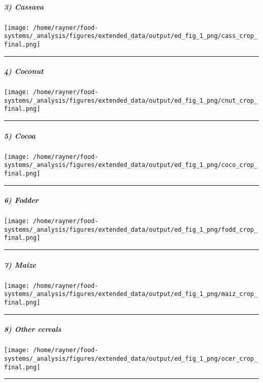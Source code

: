 \documentclass[
]{article}
\begin{document}
\hypertarget{cassava}{%
\subparagraph{3) Cassava}\label{cassava}}

\texttt{[image: /home/rayner/food-systems/\_analysis/figures/extended\_data/output/ed\_fig\_1\_png/cass\_crop\_final.png]}

\begin{center}\rule{0.5\linewidth}{0.5pt}\end{center}

\hypertarget{coconut}{%
\subparagraph{4) Coconut}\label{coconut}}

\texttt{[image: /home/rayner/food-systems/\_analysis/figures/extended\_data/output/ed\_fig\_1\_png/cnut\_crop\_final.png]}

\begin{center}\rule{0.5\linewidth}{0.5pt}\end{center}

\hypertarget{cocoa}{%
\subparagraph{5) Cocoa}\label{cocoa}}

\texttt{[image: /home/rayner/food-systems/\_analysis/figures/extended\_data/output/ed\_fig\_1\_png/coco\_crop\_final.png]}

\begin{center}\rule{0.5\linewidth}{0.5pt}\end{center}

\hypertarget{fodder}{%
\subparagraph{6) Fodder}\label{fodder}}

\texttt{[image: /home/rayner/food-systems/\_analysis/figures/extended\_data/output/ed\_fig\_1\_png/fodd\_crop\_final.png]}

\begin{center}\rule{0.5\linewidth}{0.5pt}\end{center}

\hypertarget{maize}{%
\subparagraph{7) Maize}\label{maize}}

\texttt{[image: /home/rayner/food-systems/\_analysis/figures/extended\_data/output/ed\_fig\_1\_png/maiz\_crop\_final.png]}

\begin{center}\rule{0.5\linewidth}{0.5pt}\end{center}

\hypertarget{other-cereals}{%
\subparagraph{8) Other cereals}\label{other-cereals}}

\texttt{[image: /home/rayner/food-systems/\_analysis/figures/extended\_data/output/ed\_fig\_1\_png/ocer\_crop\_final.png]}

\begin{center}\rule{0.5\linewidth}{0.5pt}\end{center}
\end{document}
